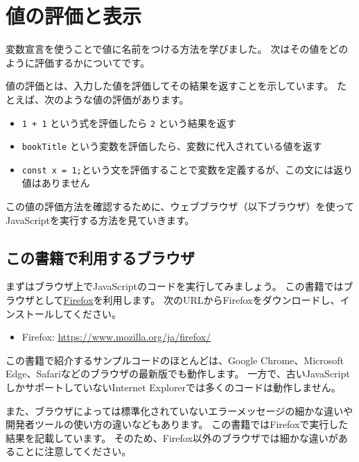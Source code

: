 \hypertarget{read-eval-print}{%
\chapter{値の評価と表示}\label{read-eval-print}}
\thispagestyle{frontheadings}

変数宣言を使うことで値に名前をつける方法を学びました。
次はその値をどのように評価するかについてです。

値の評価とは、入力した値を評価してその結果を返すことを示しています。
たとえば、次のような値の評価があります。

\begin{itemize}
\item
  \texttt{1 + 1} という式を評価したら
  \texttt{2} という結果を返す
\item
  \texttt{bookTitle}
  という変数を評価したら、変数に代入されている値を返す
\item
  \texttt{const x = 1;}という文を評価することで変数を定義するが、この文には返り値はありません
\end{itemize}

この値の評価方法を確認するために、ウェブブラウザ（以下ブラウザ）を使ってJavaScriptを実行する方法を見ていきます。

\hypertarget{recommended-browser}{%
\section{この書籍で利用するブラウザ}\label{recommended-browser}}

まずはブラウザ上でJavaScriptのコードを実行してみましょう。
この書籍ではブラウザとして\href{https://www.mozilla.org/ja/firefox/}{Firefox}を利用します。
次のURLからFirefoxをダウンロードし、インストールしてください。

\begin{itemize}
\item
  Firefox: \url{https://www.mozilla.org/ja/firefox/}
\end{itemize}

この書籍で紹介するサンプルコードのほとんどは、Google Chrome、Microsoft
Edge、Safariなどのブラウザの最新版でも動作します。
一方で、古いJavaScriptしかサポートしていないInternet
Explorerでは多くのコードは動作しません。

また、ブラウザによっては標準化されていないエラーメッセージの細かな違いや開発者ツールの使い方の違いなどもあります。
この書籍ではFirefoxで実行した結果を記載しています。
そのため、Firefox以外のブラウザでは細かな違いがあることに注意してください。

